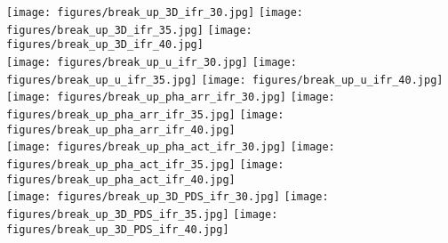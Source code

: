 \documentclass[aps,pre,amsfonts,amssymb,amsmath,twocolumn, superscriptaddress]{revtex4-1}
\newcommand{\figbreakup}{2.5cm}
\begin{document}
\begin{figure*}
    \centering
{} 
\texttt{[image: figures/break\_up\_3D\_ifr\_30.jpg]}
\texttt{[image: figures/break\_up\_3D\_ifr\_35.jpg]}
\texttt{[image: figures/break\_up\_3D\_ifr\_40.jpg]}
\\ 
\texttt{[image: figures/break\_up\_u\_ifr\_30.jpg]}
\texttt{[image: figures/break\_up\_u\_ifr\_35.jpg]}
\texttt{[image: figures/break\_up\_u\_ifr\_40.jpg]}
\\
\texttt{[image: figures/break\_up\_pha\_arr\_ifr\_30.jpg]}
\texttt{[image: figures/break\_up\_pha\_arr\_ifr\_35.jpg]}
\texttt{[image: figures/break\_up\_pha\_arr\_ifr\_40.jpg]}
\\ 
\texttt{[image: figures/break\_up\_pha\_act\_ifr\_30.jpg]}
\texttt{[image: figures/break\_up\_pha\_act\_ifr\_35.jpg]}
\texttt{[image: figures/break\_up\_pha\_act\_ifr\_40.jpg]}
\\
\texttt{[image: figures/break\_up\_3D\_PDS\_ifr\_30.jpg]}
\hspace{0.3cm}
\texttt{[image: figures/break\_up\_3D\_PDS\_ifr\_35.jpg]}
\hspace{0.3cm}
\texttt{[image: figures/break\_up\_3D\_PDS\_ifr\_40.jpg]}
       
  

\end{figure*}
\end{document}
